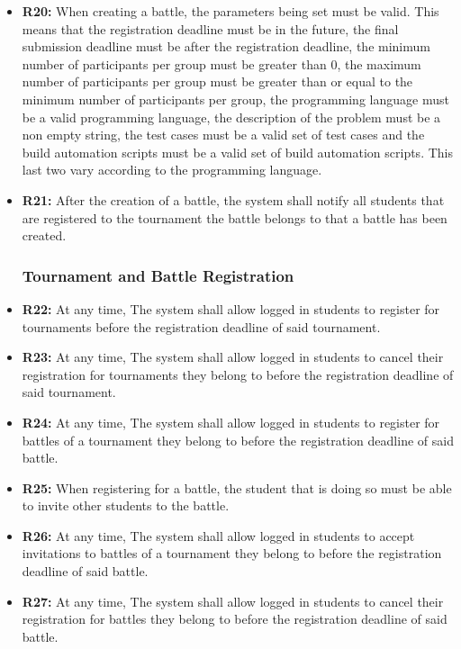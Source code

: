 \documentclass{article}
\begin{document}
\begin{itemize}
    \item \textbf{R20:} When creating a battle, the parameters being set must be valid. This means that the registration deadline must be in the future, the final submission deadline must be after the registration deadline, the minimum number of participants per group must be greater than 0, the maximum number of participants per group must be greater than or equal to the minimum number of participants per group, the programming language must be a valid programming language, the description of the problem must be a non empty string, the test cases must be a valid set of test cases and the build automation scripts must be a valid set of build automation scripts. This last two vary according to the programming language.
    \item \textbf{R21:} After the creation of a battle, the system shall notify all students that are registered to the tournament the battle belongs to that a battle has been created.

    \subsubsection*{Tournament and Battle Registration}

    \item \textbf{R22:} At any time, The system shall allow logged in students to register for tournaments before the registration deadline of said tournament.
    \item \textbf{R23:} At any time, The system shall allow logged in students to cancel their registration for tournaments they belong to before the registration deadline of said tournament.
    \item \textbf{R24:} At any time, The system shall allow logged in students to register for battles of a tournament they belong to before the registration deadline of said battle.
    \item \textbf{R25:} When registering for a battle, the student that is doing so must be able to invite other students to the battle.
    \item \textbf{R26:} At any time, The system shall allow logged in students to accept invitations to battles of a tournament they belong to before the registration deadline of said battle.
    \item \textbf{R27:} At any time, The system shall allow logged in students to cancel their registration for battles they belong to before the registration deadline of said battle.
    

\end{itemize}
\end{document}

